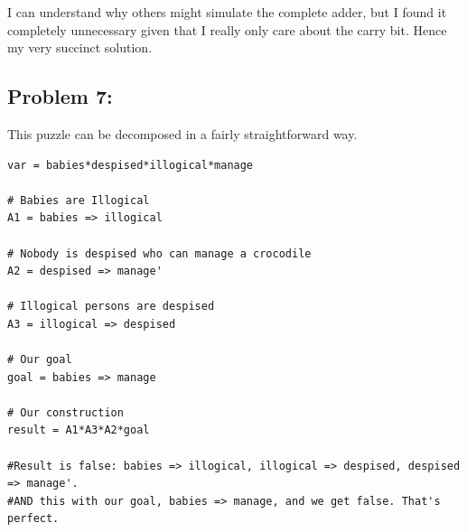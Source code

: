 \documentclass[a4paper]{article}
\begin{document}
I can understand why others might simulate the complete adder, but I found it completely unnecessary given that I really only care about the carry bit. Hence my very succinct solution.

\subsection*{Problem 7:} This puzzle can be decomposed in a fairly straightforward way.
\begin{verbatim}
var = babies*despised*illogical*manage

# Babies are Illogical
A1 = babies => illogical

# Nobody is despised who can manage a crocodile
A2 = despised => manage'

# Illogical persons are despised
A3 = illogical => despised

# Our goal
goal = babies => manage

# Our construction
result = A1*A3*A2*goal

#Result is false: babies => illogical, illogical => despised, despised => manage'.
#AND this with our goal, babies => manage, and we get false. That's perfect.
\end{verbatim}
\end{document}
